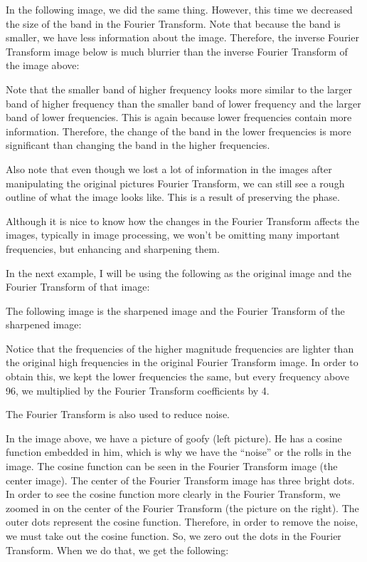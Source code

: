 \documentclass [../article.tex]{subfiles}
\begin{document}
  In the following image, we did the same thing.  However, this time
  we decreased the size of the band in the Fourier Transform.  Note
  that because the band is smaller, we have less information about
  the image.  Therefore, the inverse Fourier Transform image below
  is much blurrier than the inverse Fourier Transform of the image
  above:

  Note that the smaller band of higher frequency looks more similar
  to the larger band of higher frequency than the smaller band of
  lower frequency and the larger band of lower frequencies.  This is
  again because lower frequencies contain more information.
  Therefore, the change of the band in the lower frequencies is more
  significant than changing the band in the higher frequencies.

  Also note that even though we lost a lot of information in the
  images after manipulating the original pictures Fourier Transform,
  we can still see a rough outline of what the image looks like.
  This is a result of preserving the phase.

  Although it is nice to know how the changes in the Fourier
  Transform affects the images, typically in image processing, we
  won’t be omitting many important frequencies, but enhancing and
  sharpening them.

  In the next example, I will be using the following as the original
  image and the Fourier Transform of that image:

  The following image is the sharpened image and the Fourier
  Transform of the sharpened image:

  Notice that the frequencies of the higher magnitude frequencies
  are lighter than the original high frequencies in the original
  Fourier Transform image.  In order to obtain this, we kept the
  lower frequencies the same, but every frequency above 96, we
  multiplied by the Fourier Transform coefficients by 4.

  The Fourier Transform is also used to reduce noise.

  In the image above, we have a picture of goofy (left picture).  He
  has a cosine function embedded in him, which is why we have the
  “noise” or the rolls in the image. The cosine function can be seen
  in the Fourier Transform image (the center image).  The center of
  the Fourier Transform image has three bright dots.  In order to
  see the cosine function more clearly in the Fourier Transform, we
  zoomed in on the center of the Fourier Transform (the picture on
  the right).  The outer dots represent the cosine function.
  Therefore, in order to remove the noise, we must take out the
  cosine function.  So, we zero out the dots in the Fourier
  Transform.  When we do that, we get the following:
\end{document}
